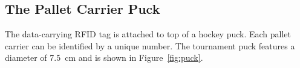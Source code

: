 \documentclass[12pt,twoside]{article}
\begin{document}




\subsection{The Pallet Carrier Puck}
The data-carrying RFID tag is attached to top of a hockey puck. Each
pallet carrier can be identified by a unique number. The tournament puck
features a diameter of \SI{7.5}{\centi\metre} and is shown in Figure~\ref{fig:puck}.

\end{document}

